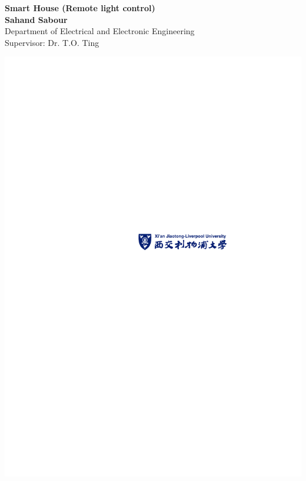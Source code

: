 \documentclass[a0,portrait]{a0poster}
\begin{document}


\begin{minipage}[b]{0.75\linewidth}
\veryHuge \color{NavyBlue} \textbf{Smart House (Remote light control)} \color{Black}\\ %

\huge \textbf{Sahand Sabour}\\[0.5cm] %
\huge Department of Electrical and Electronic Engineering\\[0.4cm] %
\huge Supervisor: Dr. T.O. Ting\\
\end{minipage}
%
\begin{minipage}[b]{0.25\linewidth}
\includegraphics[scale=2.8]{fig/logo}\\
\end{minipage}
\end{document}
